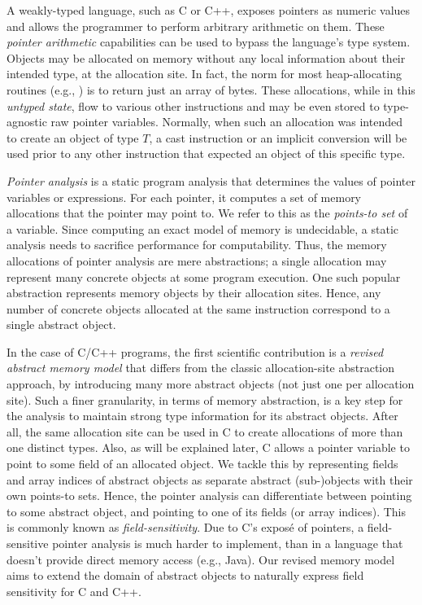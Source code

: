 A weakly-typed language, such as C or C++, exposes pointers as numeric
values and allows the programmer to perform arbitrary arithmetic on
them. These \emph{pointer arithmetic} capabilities can be used to
bypass the language's type system. Objects may be allocated on memory
without any local information about their intended type, at the
allocation site. In fact, the norm for most heap-allocating routines
(e.g., ) is to return just an array of bytes. These
allocations, while in this \emph{untyped state}, flow to various other
instructions and may be even stored to type-agnostic raw pointer
variables. Normally, when such an allocation was intended to create an
object of type \(T\), a cast instruction or an implicit conversion
will be used prior to any other instruction that expected an object of
this specific type.

\emph{Pointer analysis} is a static program analysis that determines
the values of pointer variables or expressions. For each pointer, it
computes a set of memory allocations that the pointer may point to. We
refer to this as the \emph{points-to set} of a variable. Since
computing an exact model of memory is undecidable, a static analysis
needs to sacrifice performance for computability. Thus, the memory
allocations of pointer analysis are mere abstractions; a single
allocation may represent many concrete objects at some program
execution. One such popular abstraction represents memory objects by
their allocation sites. Hence, any number of concrete objects
allocated at the same instruction correspond to a single abstract
object.

In the case of C/C++ programs, the first scientific contribution is a
\emph{revised abstract memory model} that differs from the classic
allocation-site abstraction approach, by introducing many more
abstract objects (not just one per allocation site). Such a finer
granularity, in terms of memory abstraction, is a key step for the
analysis to maintain strong type information for its abstract
objects. After all, the same allocation site can be used in C to
create allocations of more than one distinct types. Also, as will be
explained later, C allows a pointer variable to point to some field of
an allocated object. We tackle this by representing fields and array
indices of abstract objects as separate abstract (sub-)objects with
their own points-to sets. Hence, the pointer analysis can
differentiate between pointing to some abstract object, and pointing
to one of its fields (or array indices). This is commonly known as
\emph{field-sensitivity}. Due to C's expos\'{e} of pointers, a
field-sensitive pointer analysis is much harder to implement, than in
a language that doesn't provide direct memory access (e.g., Java). Our
revised memory model aims to extend the domain of abstract objects to
naturally express field sensitivity for C and C++.

